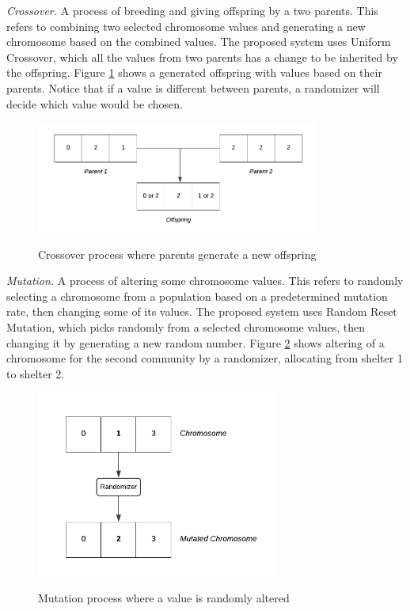 	\textit{Crossover.} A process of breeding and giving offspring by a two parents. This refers to combining two selected chromosome values and generating a new chromosome based on the combined values. The proposed system uses Uniform Crossover, which all the values from two parents has a change to be inherited by the offspring. Figure \ref{Crossover} shows a generated offspring with values based on their parents. Notice that if a value is different between parents, a randomizer will decide which value would be chosen.
	
	\begin{figure}[h!]
		\caption{Crossover process where parents generate a new offspring}
		\centering
		\includegraphics[width=350px]{Crossover}
		\label{Crossover}
	\end{figure}
	
	\textit{Mutation.} A process of altering some chromosome values. This refers to randomly selecting a chromosome from a population based on a predetermined mutation rate, then changing some of its values. The proposed system uses Random Reset Mutation, which picks randomly from a selected chromosome values, then changing it by generating a new random number. Figure \ref{Mutation} shows altering of a chromosome for the second community by a randomizer, allocating from shelter 1 to shelter 2.
	
	\begin{figure}[h!]
		\caption{Mutation process where a value is randomly altered}
		\centering
		\includegraphics[width=300px]{Mutation}
		\label{Mutation}
	\end{figure}
	

